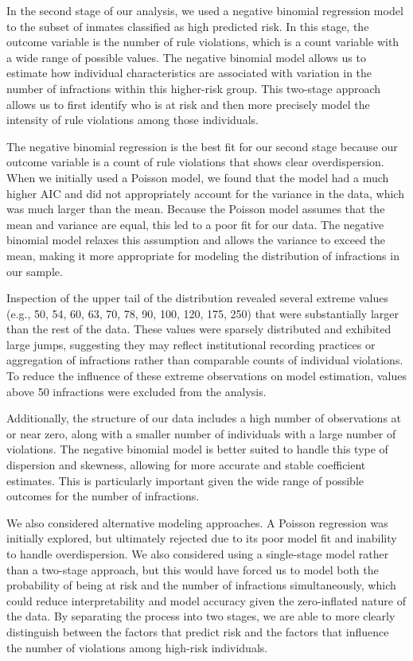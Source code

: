 \documentclass[
]{article}
\begin{document}
In the second stage of our analysis, we used a negative binomial
regression model to the subset of inmates classified as high predicted
risk. In this stage, the outcome variable is the number of rule
violations, which is a count variable with a wide range of possible
values. The negative binomial model allows us to estimate how individual
characteristics are associated with variation in the number of
infractions within this higher-risk group. This two-stage approach
allows us to first identify who is at risk and then more precisely model
the intensity of rule violations among those individuals.

The negative binomial regression is the best fit for our second stage
because our outcome variable is a count of rule violations that shows
clear overdispersion. When we initially used a Poisson model, we found
that the model had a much higher AIC and did not appropriately account
for the variance in the data, which was much larger than the mean.
Because the Poisson model assumes that the mean and variance are equal,
this led to a poor fit for our data. The negative binomial model relaxes
this assumption and allows the variance to exceed the mean, making it
more appropriate for modeling the distribution of infractions in our
sample.

Inspection of the upper tail of the distribution revealed several
extreme values (e.g., 50, 54, 60, 63, 70, 78, 90, 100, 120, 175, 250)
that were substantially larger than the rest of the data. These values
were sparsely distributed and exhibited large jumps, suggesting they may
reflect institutional recording practices or aggregation of infractions
rather than comparable counts of individual violations. To reduce the
influence of these extreme observations on model estimation, values
above 50 infractions were excluded from the analysis.

Additionally, the structure of our data includes a high number of
observations at or near zero, along with a smaller number of individuals
with a large number of violations. The negative binomial model is better
suited to handle this type of dispersion and skewness, allowing for more
accurate and stable coefficient estimates. This is particularly
important given the wide range of possible outcomes for the number of
infractions.

We also considered alternative modeling approaches. A Poisson regression
was initially explored, but ultimately rejected due to its poor model
fit and inability to handle overdispersion. We also considered using a
single-stage model rather than a two-stage approach, but this would have
forced us to model both the probability of being at risk and the number
of infractions simultaneously, which could reduce interpretability and
model accuracy given the zero-inflated nature of the data. By separating
the process into two stages, we are able to more clearly distinguish
between the factors that predict risk and the factors that influence the
number of violations among high-risk individuals.
\end{document}
